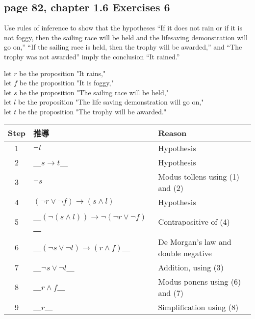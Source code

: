 \documentclass[sigconf]{acmart}
\begin{document}
\newpage

\subsection{page 82, chapter 1.6 Exercises 6}
\begin{shaded}
    Use rules of inference to show that the hypotheses “If it does not rain or if it is not foggy, then the sailing race will be held and the lifesaving demonstration will go on,” “If the sailing race is held, then the trophy will be awarded,” and “The trophy was not awarded” imply the conclusion “It rained.”
\end{shaded} 
let $r$ be the proposition "It rains," \\
let $f$ be the proposition "It is foggy," \\
let $s$ be the proposition "The sailing race will be held," \\
let $l$ be the proposition "The life saving demonstration will go on," \\
let $t$ be the proposition "The trophy will be awarded." 
\begin{table}[h]
	\centering
	\begin{tabular}{|c|l|l|}
    	\hline
     Step & 推導                 & Reason \\ \hline
    	1 & $ \neg t $           & Hypothesis \\
    	2 & \underline{~~$s \rightarrow t$~~}  & Hypothesis \\
    	3 & $ \neg s $       & Modus tollens using (1) and (2) \\
    	4 & $ (\neg r \lor \neg f) \rightarrow (s \land l)$ & Hypothesis \\
    	5 & \underline{~~$(\neg (s \land l)) \rightarrow \neg (\neg r \lor \neg f)$~~}  & Contrapositive of (4) \\
    	6 & \underline{~~$(\neg s \lor \neg l) \rightarrow (r \land f)$~~}  & De Morgan's law and double negative \\
    	7 & \underline{~~$\neg s \lor \neg l$~~}  & Addition, using (3) \\
    	8 & \underline{~~$r \land f$~~}  & Modus ponens using (6) and (7) \\
    	9 & \underline{~~$r$~~}  & Simplification using (8) \\ \hline
	\end{tabular}
\end{table}
\end{document}
